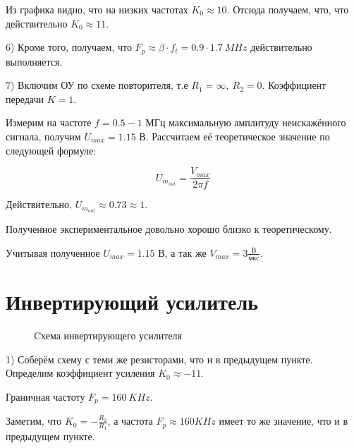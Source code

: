 \documentclass[15pt,a5paper,reqno]{article}
\begin{document}
Из графика видно, что на низких частотах $K_0 \approx 10$. 
Отсюда получаем, что, что действительно $K_0 \approx 11 $.

6) Кроме того, получаем, что $F_p \approx \beta \cdot f_t = 0.9 \cdot 1.7 \: MHz$ действительно выполняется.

7) Включим ОУ по схеме повторителя, т.е $R_1 = \infty, \: R_2 = 0$.
Коэффициент передачи $K = 1$.


Измерим на частоте $f = 0.5 − 1$ МГц максимальную амплитуду неискажённого сигнала, получим $U_{max} = 1.15$ В. Рассчитаем её теоретическое значение по следующей
формуле:

\[ U_{m_{out}} = \frac{V_{max}}{2 \pi f}  \]

Действительно, $U_{m_{out}} \approx 0. 73 \approx 1$.

Полученное экспериментальное довольно хорошо близко к теоретическому.

Учитывая полученное $U_{max} = 1.15$ В, а так же $V_{max} = 3 \frac{В}{мкс}$.


\section{Инвертирующий усилитель}


\begin {figure}[h!]
      \caption{Cхема инвертирующего усилителя}      
      \label {fig:image1}
\end {figure}

1) Соберём схему с теми же резисторами, что и в предыдущем пункте.
Определим коэффициент усиления $K_0 \approx −11$.

Граничная частоту $F_p = 160 \: KHz$. 

Заметим, что $K_0 = -\frac{R_2}{R_1}$, а частота $F_p \approx 160 KHz$ имеет то же значение, что и в предыдущем пункте.
\end{document}
